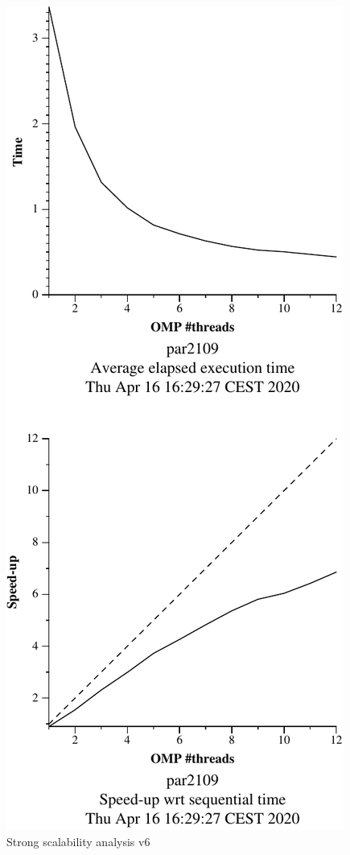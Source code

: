 \begin{figure}[H]
\begin{minipage}{0.5\textwidth}
        \includegraphics[width=0.7\linewidth]{plots/v6-crop.pdf}
        \caption{Strong scalability analysis v6}
        \label{fig:ssa_v6} 
    \end{minipage}
\end{figure}

